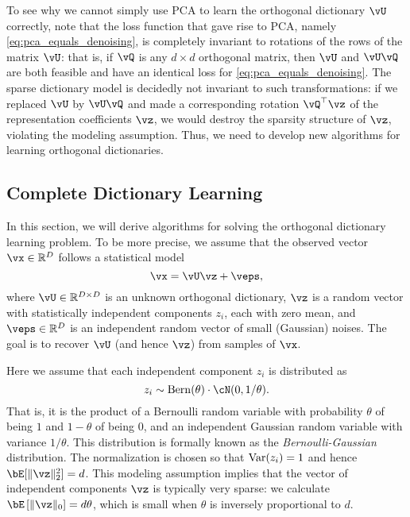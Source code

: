 \documentclass[\toplevelprefix/book-main.tex]{subfiles}
\begin{document}
To see why we cannot simply use PCA to learn the orthogonal dictionary $\vU$ correctly, note that the 
loss function that gave rise to PCA, namely \eqref{eq:pca_equals_denoising}, is completely invariant to rotations of the rows of the matrix $\vU$: that is, if $\vQ$ is any $d \times d$ orthogonal matrix, then $\vU$ and $\vU \vQ$ are both feasible and have an identical loss for \eqref{eq:pca_equals_denoising}. The sparse dictionary model is decidedly not invariant to such transformations: if we replaced $\vU$ by $\vU \vQ$ and made a corresponding rotation $\vQ^\top \vz$ of the representation coefficients $\vz$, we would destroy the sparsity structure of $\vz$, violating the modeling assumption. Thus, we need to develop new algorithms for learning orthogonal dictionaries. 

\subsection{Complete Dictionary Learning}
\label{sec:complete-dictionary}

In this section, we will derive algorithms for solving the orthogonal dictionary learning problem. To be more precise,  we assume that the observed vector $\vx \in \R^D$ follows a statistical model
\begin{equation}
    \vx = \vU \vz + \veps, 
    \label{eq:ica-model-ch2}
\end{equation}
where $\vU \in \R^{D \times D}$ is an unknown orthogonal dictionary, $\vz$ is a random vector with statistically independent components $z_i$, each with zero mean, and $\veps \in \R^D$ is an independent random vector of small (Gaussian) noises. The goal is to recover $\vU$ (and hence $\vz$) from samples of $\vx$.

Here we assume that each independent component $z_i$ is distributed as $$z_i \sim \mathrm{Bern}(\theta) \cdot \cN(0, 1/\theta).$$ That is, it is the product of a Bernoulli random variable with probability $\theta$ of being $1$ and $1-\theta$ of being $0$, and an independent Gaussian random variable with variance $1/\theta$. This distribution is formally known as the {\em Bernoulli-Gaussian} distribution. 
The normalization is chosen so that $\operatorname{Var}(z_i) = 1$ and hence $\bE[\norm{\vz}_2^2]=d$. 
This modeling assumption implies that the vector of independent components $\vz$ is typically very sparse: 
we calculate $\bE\left[\norm{\vz}_0\right] = d\theta$, which is small when $\theta$ is inversely proportional to $d$. 
\end{document}

